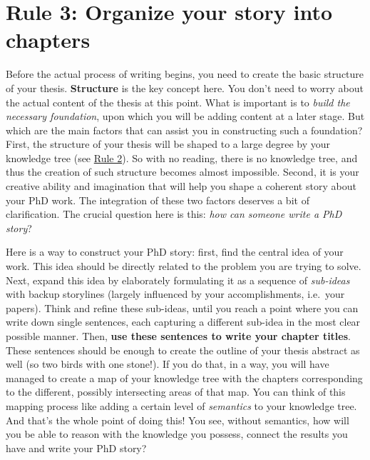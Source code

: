 \documentclass[
  12pt,
  oneside]{book}
\begin{document}
\hypertarget{rule3}{%
\section*{\texorpdfstring{\textbf{Rule 3:} Organize your story into chapters}{Rule 3: Organize your story into chapters}}\label{rule3}}

Before the actual process of writing begins, you need to create the basic structure of your thesis.
\textbf{Structure} is the key concept here.
You don't need to worry about the actual content of the thesis at this point.
What is important is to \emph{build the necessary foundation}, upon which you will be adding content at a later stage.
But which are the main factors that can assist you in constructing such a foundation?
First, the structure of your thesis will be shaped to a large degree by your knowledge tree (see \protect\hyperlink{rule2}{Rule 2}).
So with no reading, there is no knowledge tree, and thus the creation of such structure becomes almost impossible.
Second, it is your creative ability and imagination that will help you shape a coherent story about your PhD work.
The integration of these two factors deserves a bit of clarification.
The crucial question here is this: \emph{how can someone write a PhD story}?

Here is a way to construct your PhD story: first, find the central idea of your work.
This idea should be directly related to the problem you are trying to solve.
Next, expand this idea by elaborately formulating it as a sequence of \emph{sub-ideas} with backup storylines (largely influenced by your accomplishments, i.e.~your papers).
Think and refine these sub-ideas, until you reach a point where you can write down single sentences, each capturing a different sub-idea in the most clear possible manner.
Then, \textbf{use these sentences to write your chapter titles}.
These sentences should be enough to create the outline of your thesis abstract as well (so two birds with one stone!).
If you do that, in a way, you will have managed to create a map of your knowledge tree with the chapters corresponding to the different, possibly intersecting areas of that map.
You can think of this mapping process like adding a certain level of \emph{semantics} to your knowledge tree.
And that's the whole point of doing this!
You see, without semantics, how will you be able to reason with the knowledge you possess, connect the results you have and write your PhD story?
\end{document}
